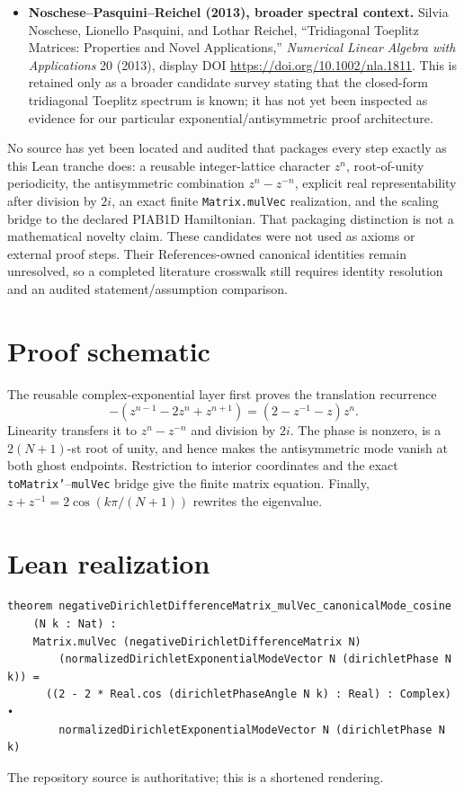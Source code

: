 \documentclass[11pt]{article}
\begin{document}
\begin{itemize}
\item \textbf{Noschese--Pasquini--Reichel (2013), broader spectral context.} Silvia Noschese,
Lionello Pasquini, and Lothar Reichel, ``Tridiagonal Toeplitz Matrices: Properties and
Novel Applications,'' \emph{Numerical Linear Algebra with Applications} 20 (2013),
display DOI \url{https://doi.org/10.1002/nla.1811}. This is retained only as a broader
candidate survey stating that the closed-form tridiagonal Toeplitz spectrum is known; it
has not yet been inspected as evidence for our particular exponential/antisymmetric proof
architecture.
\end{itemize}

No source has yet been located and audited that packages every step exactly as this Lean tranche
does: a reusable integer-lattice character $z^n$, root-of-unity periodicity, the antisymmetric
combination $z^n-z^{-n}$, explicit real representability after division by $2i$, an exact finite
\texttt{Matrix.mulVec} realization, and the scaling bridge to the declared PIAB1D Hamiltonian.
That packaging distinction is not a mathematical novelty claim. These candidates were not used as
axioms or external proof steps. Their References-owned canonical identities remain unresolved, so
a completed literature crosswalk still requires identity resolution and an audited
statement/assumption comparison.

\section{Proof schematic}
The reusable complex-exponential layer first proves the translation recurrence
\[
-(z^{n-1}-2z^n+z^{n+1})=(2-z^{-1}-z)z^n.
\]
Linearity transfers it to $z^n-z^{-n}$ and division by $2i$. The phase is nonzero, is a
$2(N+1)$-st root of unity, and hence makes the antisymmetric mode vanish at both ghost
endpoints. Restriction to interior coordinates and the exact \texttt{toMatrix'}--\texttt{mulVec}
bridge give the finite matrix equation. Finally,
$z+z^{-1}=2\cos(k\pi/(N+1))$ rewrites the eigenvalue.

\section{Lean realization}
\begin{lstlisting}
theorem negativeDirichletDifferenceMatrix_mulVec_canonicalMode_cosine
    (N k : Nat) :
    Matrix.mulVec (negativeDirichletDifferenceMatrix N)
        (normalizedDirichletExponentialModeVector N (dirichletPhase N k)) =
      ((2 - 2 * Real.cos (dirichletPhaseAngle N k) : Real) : Complex) •
        normalizedDirichletExponentialModeVector N (dirichletPhase N k)
\end{lstlisting}
The repository source is authoritative; this is a shortened rendering.
\end{document}
